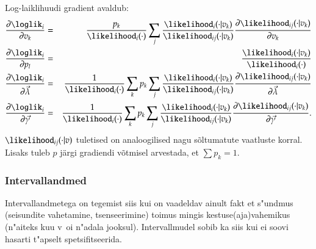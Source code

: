 \documentclass[a4paper]{article}
\numberwithin{equation}{subsection}
\begin{document}
Log-laiklihuudi gradient avaldub:
\begin{eqnarray}
  \frac{\partial \loglik_i}{\partial v_k} & = &
  \frac{p_k}{\likelihood_i(\cdot)}
  \sum_j \frac{\likelihood_i(\cdot|v_k)}{\likelihood_{ij}(\cdot|v_k)}
  \frac{\partial \likelihood_{ij}(\cdot|v_k)}{\partial v_k}\\
  \frac{\partial \loglik_i}{\partial p_l} & = &
  \frac{\likelihood_i(\cdot|v_k)}{\likelihood_i(\cdot)}\\
  \frac{\partial \loglik_i}{\partial \vec{\lambda}} & = &
  \frac{1}{\likelihood_i(\cdot)} 
  \sum_k p_k
  \sum_j \frac{\likelihood_i(\cdot|v_k)}{\likelihood_{ij}(\cdot|v_k)}
  \frac{\partial \likelihood_{ij}(\cdot|v_k)}{\partial \vec{\lambda}}\\
  \frac{\partial \loglik_i}{\partial \vec{\gamma}} & = &
  \frac{1}{\likelihood_i(\cdot)} 
  \sum_k p_k
  \sum_j \frac{\likelihood_i(\cdot|v_k)}{\likelihood_{ij}(\cdot|v_k)}
  \frac{\partial \likelihood_{ij}(\cdot|v_k)}{\partial \vec{\gamma}}.
\end{eqnarray}
$\likelihood_{ij}(\cdot|v)$ tuletised on analoogilised nagu sõltumatute
vaatluste korral.  Lisaks tuleb $p$ järgi gradiendi võtmisel
arvestada, et $\sum p_k = 1$.




\clearpage



\subsubsection{Intervallandmed}
\label{sec:intervallandmed}

Intervallandmetega on tegemist siis kui on vaadeldav ainult fakt et
s"undmus (seisundite vahetamine, tsenseerimine) toimus mingis
kestuse(aja)vahemikus (n"aiteks kuu v~oi n"adala jooksul).  Intervallmudel
sobib ka siis kui ei soovi hasarti t"apselt spetsifitseerida.
\end{document}
